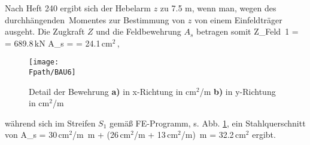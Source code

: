 {Nach Heft 240 ergibt sich der Hebelarm $z$ zu 7.5 m, wenn man, wegen des \glq durchh\"{a}ngenden\grq\ Momentes zur Bestimmung von $z$ von einem Einfeldtr\"{a}ger ausgeht. Die Zugkraft $Z$ und die Feldbewehrung $A_s$ betragen somit
\bfoo
Z_{\mbox{Feld 1}} =  = 689.8\,\mbox{kN} \qquad
A_s =  = 24.1\,\mbox{cm$^2$}\,,
\efoo
\begin{figure}[tbp] \centering
\if {} \sidecaption \fi
\texttt{[image: \\Fpath/BAU6]}
\caption{Detail der Bewehrung {\bf a)} in x-Richtung in cm$^2$/m {\bf b)} in y-Richtung
in cm$^2$/m } \label{Bau6}
\end{figure}%
w\"{a}hrend sich im Streifen $S_1$ gem\"{a}{\ss} FE-Programm, s. Abb. \ref{Bau6}, ein
Stahlquerschnitt von
\bfoo
A_s = 30\,\mbox{cm$^2$/m} \,\mbox{m} + (26\,\mbox{cm$^2$/m} +
13\,\mbox{cm$^2$/m}) \cdot {}  \,\mbox{m} = 32.2\,\mbox{cm$^2$}
\efoo
ergibt.

}
